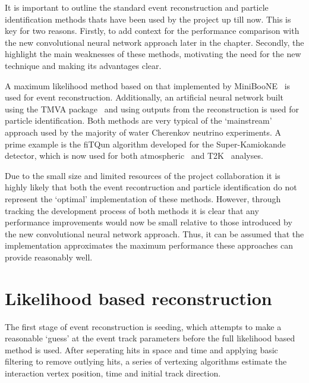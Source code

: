 It is important to outline the standard event reconstruction and particle identification methods
thats have been used by the \chips project up till now. This is key for two reasons. Firstly, to
add context for the performance comparison with the new convolutional neural network approach
later in the chapter. Secondly, the highlight the main weaknesses of these methods, motivating the
need for the new technique and making its advantages clear.

A maximum likelihood method based on that implemented by MiniBooNE~\cite{patterson2009} is used
for event reconstruction. Additionally, an artificial neural network built using the TMVA
package~\cite{hocker2007} and using outputs from the reconstruction is used for particle
identification. Both methods are very typical of the `mainstream' approach used by the majority of
water Cherenkov neutrino experiments. A prime example is the fiTQun algorithm developed for the
Super-Kamiokande detector, which is now used for both atmospheric~\cite{jiang2019} and
T2K~\cite{missert2017} analyses.

Due to the small size and limited resources of the \chips project collaboration it is highly
likely that both the event recontruction and particle identification do not represent the
`optimal' implementation of these methods. However, through tracking the development process of
both methods it is clear that any performance improvements would now be small relative to those
introduced by the new convolutional neural network approach. Thus, it can be assumed that
the implementation approximates the maximum performance these approaches can provide reasonably
well.

\section{Likelihood based reconstruction} %
\label{sec:cvn_old_reco} %

The first stage of event reconstruction is seeding, which attempts to make a reasonable `guess' at
the event track parameters before the full likelihood based method is used. After seperating hits
in space and time and applying basic filtering to remove outlying hits, a series of vertexing
algorithms estimate the interaction vertex position, time and initial track direction.

